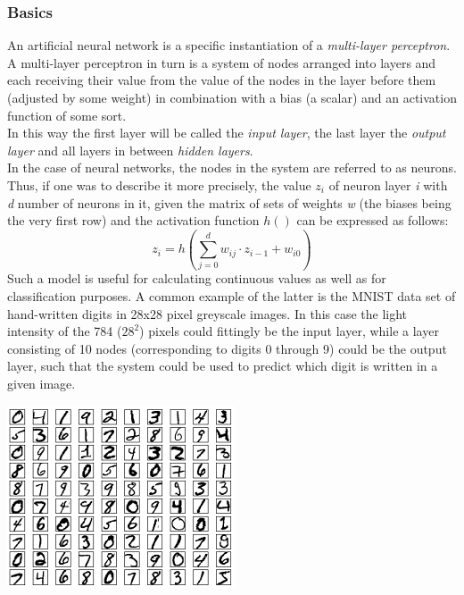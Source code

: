 \subsubsection{Basics}
An artificial neural network is a specific instantiation of a \textit{multi-layer perceptron}.
A multi-layer perceptron in turn is a system of nodes arranged into layers and each receiving their value from the value of the nodes in the layer before them (adjusted by some weight) in combination with a bias (a scalar) and an activation function of some sort. \\
In this way the first layer will be called the \textit{input layer}, the last layer the \textit{output layer} and all layers in between \textit{hidden layers}. \\
In the case of neural networks, the nodes in the system are referred to as neurons.
Thus, if one was to describe it more precisely, the value $z_i$ of neuron layer \textit{i} with \textit{d} number of neurons in it, given the matrix of sets of weights \textit{w} (the biases being the very first row) and the activation function $h()$ can be expressed as follows:
\[
z_i = h\left(\sum_{j=0}^d w_{ij}\cdot z_{i-1} + w_{i0}\right)
\]
Such a model is useful for calculating continuous values as well as for classification purposes. A common example of the latter is the MNIST data set of hand-written digits in 28x28 pixel greyscale images. In this case the light intensity of the 784 ($28^2$) pixels could fittingly be the input layer, while a layer consisting of 10 nodes (corresponding to digits 0 through 9) could be the output layer, such that the system could be used to predict which digit is written in a given image.

\begin{Figure}
 \centering
 \includegraphics[width=0.7\linewidth]{images/mnist}
 \captionsetup{width=0.8\linewidth, font=small}
\end{Figure}

